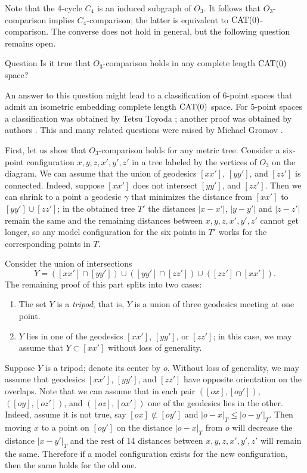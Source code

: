 \documentclass{article}
\begin{document}
Note that the 4-cycle $C_4$ is an induced subgraph of $O_3$.
It follows that $O_3$-comparison implies $C_4$-comparison;
the latter is equivalent to $\mathrm{CAT}(0)$-comparison.
The converse does not hold in general, but the following question remains open.

\begin{thm}{Question}
Is it true that $O_3$-comparison holds in any complete length $\mathrm{CAT}(0)$ space?
\end{thm}

An answer to this question might lead to a classification of 6-point spaces that admit an isometric embedding complete length $\mathrm{CAT}(0)$ space.
For 5-point spaces a classification was obtained by Tetsu Toyoda \cite{toyoda};
another proof was obtained by authors \cite{lebedeva-petrunin}.
This and many related questions were raised by Michael Gromov \cite[1.19$_+(e)$]{gromov}.

First, let us show that $O_3$-comparison holds for any metric tree.
Consider a six-point configuration $x,y,z,x',y',z'$ in a tree labeled by the vertices of $O_3$ on the diagram.
We can assume that the union of geodesics $[xx']$, $[yy']$, and $[zz']$ is connected.
Indeed, suppose $[xx']$ does not intersect $[yy']$, and $[zz']$.
Then we can shrink to a point a geodesic $\gamma$ that minimizes the distance from $[xx']$ to $[yy']\cup[zz']$;
in the obtained tree $T'$ the distances $|x-x'|$, $|y-y'|$ and $|z-z'|$ remain the same and the remaining distances between $x,y,z,x',y',z'$ cannot get longer, so any model configuration for the six points in $T'$ works for the corresponding points in $T$.

Consider the union of intersections 
\[Y=([xx']\cap [yy'])\cup([yy']\cap [zz'])\cup([zz']\cap [xx']).\]
The remaining proof of this part splits into two cases:
\begin{enumerate}
\item The set $Y$ is a \emph{tripod}; that is, $Y$ is a union of three geodesics meeting at one point. 
\item $Y$ lies in one of the  geodesics $[xx']$, $[yy']$, or $[zz']$; in this case, we may assume that $Y\subset [xx']$ without loss of generality.
\end{enumerate}

Suppose $Y$ is a tripod; denote its center by $o$.
Without loss of generality, we may assume that geodesics $[xx']$, $[yy']$, and $[zz']$ have opposite orientation on the overlaps.
Note that we can assume that in each pair $([ox],[oy'])$, $([oy],[oz'])$, and $([oz],[ox'])$ one of the geodesics lies in the other.
Indeed, assume it is not true, say $[ox]\not\subset[oy']$ and $|o-x|_T\le |o-y'|_T$.
Then moving $x$ to a point on $[oy']$ on the distance $|o-x|_T$ from $o$ will decrease the distance $|x-y'|_T$ and the rest of 14 distances between $x,y,z,x',y',z'$ will remain the same.
Therefore if a model configuration exists for the new configuration, then the same holds for the old one. 
\end{document}
